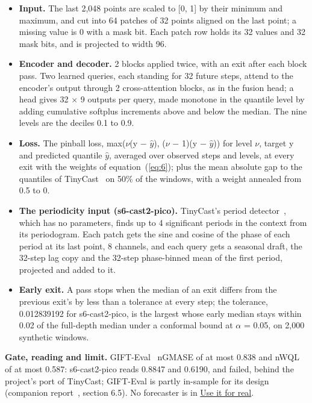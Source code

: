 \documentclass[10pt]{article}
\begin{document}
\begin{itemize}
\item \textbf{Input.} The last 2,048 points are scaled to [0, 1] by their minimum and maximum, and cut into 64 patches of 32 points aligned on the last point; a missing value is 0 with a mask bit. Each patch row holds its 32 values and 32 mask bits, and is projected to width 96.
\item \textbf{Encoder and decoder.} 2 blocks applied twice, with an exit after each block pass. Two learned queries, each standing for 32 future steps, attend to the encoder's output through 2 cross-attention blocks, as in the fusion head; a head gives 32 $\times$ 9 outputs per query, made monotone in the quantile level by adding cumulative softplus increments above and below the median. The nine levels are the deciles 0.1 to 0.9.
\item \textbf{Loss.} The pinball loss, max($\nu$(y $-$ $\hat y$), ($\nu$ $-$ 1)(y $-$ $\hat y$)) for level $\nu$, target y and predicted quantile $\hat y$, averaged over observed steps and levels, at every exit with the weights of equation~(\ref{eq:6}); plus the mean absolute gap to the quantiles of TinyCast~\cite{tinycast} on 50\% of the windows, with a weight annealed from 0.5 to 0.
\item \textbf{The periodicity input (s6-cast2-pico).} TinyCast's period detector~\cite{steinhauser2026tinycast}, which has no parameters, finds up to 4 significant periods in the context from its periodogram. Each patch gets the sine and cosine of the phase of each period at its last point, 8 channels, and each query gets a seasonal draft, the 32-step lag copy and the 32-step phase-binned mean of the first period, projected and added to it.
\item \textbf{Early exit.} A pass stops when the median of an exit differs from the previous exit's by less than a tolerance at every step; the tolerance, 0.012839192 for s6-cast2-pico, is the largest whose early median stays within 0.02 of the full-depth median under a conformal bound at $\alpha$ = 0.05, on 2,000 synthetic windows.
\end{itemize}

\textbf{Gate, reading and limit.} GIFT-Eval~\cite{aksu2024gifteval} nGMASE of at most 0.838 and nWQL of at most 0.587: s6-cast2-pico reads 0.8847 and 0.6190, and failed, behind the project's port of TinyCast; GIFT-Eval is partly in-sample for its design (companion report~\cite{golfier2026skycmd}, section 6.5). No forecaster is in \href{https://maxgfr.github.io/skycmd/use/\#which-file}{Use it for real}.
\end{document}
